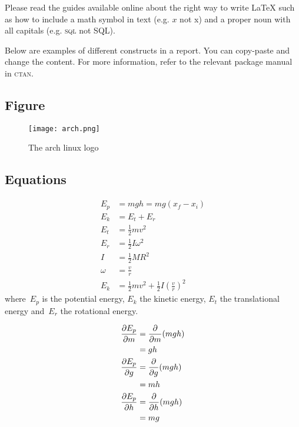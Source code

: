 \documentclass[../main.tex]{subfiles}
\begin{document}
Please read the guides available online about the right way
to write {\LaTeX} such as how to include a math symbol in
text (e.g. $x$ not x) and a proper noun with all capitals
(e.g. \textsc{sql} not SQL).

Below are examples of different constructs in a report. You
can copy-paste and change the content. For more information,
refer to the relevant package manual in \textsc{ctan}.

\subsection{Figure}

\begin{figure}[h] 
    \centering
    \texttt{[image: arch.png]} 
    \caption{The arch linux logo} \label{fig:arch-linux} 
\end{figure}

\subsection{Equations}

\begin{align}
        E_p &= mgh = mg(x_f - x_i) \label{potential}
        \\
        E_k &= E_t + E_r \nonumber
        \\
        E_t &= \frac{1}{2} mv^2 \label{translational}
        \\
        E_r &= \frac{1}{2} I \omega^2 \label{rotational}
        \\
        I &= \frac{1}{2} M R^2 \label{inertia}
        \\
        \omega &= \frac{v}{r} \nonumber
        \\
        E_k &= \frac{1}{2} mv^2 +  \frac{1}{2} I \left( \frac{v}{r}\right) ^2 \label{kinetic}
\end{align}
where~$E_p$ is the potential energy, $E_k$ the kinetic
energy, $E_t$ the translational energy and~$E_r$
the rotational energy.

\begin{align*}
        \pdv{E_p}{m} &= \pdv{m}(mgh)
        \\
                          &= gh
                          \\
        \pdv{E_p}{g} &= \pdv{g}(mgh)
        \\
                          &= mh
        \\
        \pdv{E_p}{h} &= \pdv{h}(mgh)
        \\
                          &= mg
\end{align*}
\end{document}
